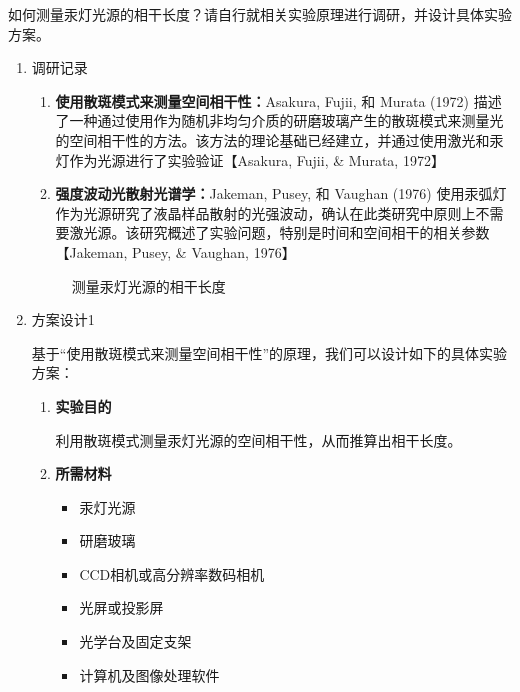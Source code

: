 \documentclass[dvipsnames, svgnames,a4paper,11pt]{article}
\begin{document}
	\begin{question}
		如何测量汞灯光源的相干长度？请自行就相关实验原理进行调研，并设计具体实验方案。
	\end{question}
	\begin{enumerate}
		\item 调研记录
		\begin{enumerate}
			\item \textbf{使用散斑模式来测量空间相干性：}Asakura, Fujii, 和 Murata (1972) 描述了一种通过使用作为随机非均匀介质的研磨玻璃产生的散斑模式来测量光的空间相干性的方法。该方法的理论基础已经建立，并通过使用激光和汞灯作为光源进行了实验验证【Asakura, Fujii, \& Murata, 1972】
			\item \textbf{强度波动光散射光谱学：}Jakeman, Pusey, 和 Vaughan (1976) 使用汞弧灯作为光源研究了液晶样品散射的光强波动，确认在此类研究中原则上不需要激光源。该研究概述了实验问题，特别是时间和空间相干的相关参数【Jakeman, Pusey, \& Vaughan, 1976】
		\end{enumerate}
		
		\begin{figure}[htbp]
			\centering
			\caption{测量汞灯光源的相干长度}
			\label{fig:fig4}			
		\end{figure}
		
		\item 方案设计1
		
		基于“使用散斑模式来测量空间相干性”的原理，我们可以设计如下的具体实验方案：
		
		\begin{enumerate}
			\item \textbf{实验目的}
			
			利用散斑模式测量汞灯光源的空间相干性，从而推算出相干长度。
			
			\item \textbf{所需材料}
			
			\begin{itemize}
				\item 汞灯光源
				\item 研磨玻璃
				\item CCD相机或高分辨率数码相机
				\item 光屏或投影屏
				\item 光学台及固定支架
				\item 计算机及图像处理软件
			\end{itemize}
			

\end{enumerate}
\end{enumerate}
\end{document}

